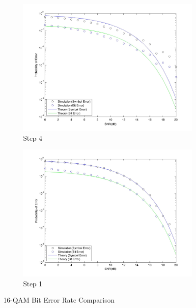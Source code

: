 \documentclass[]{article}
\begin{document}
\begin{figure}[h]
        \centering
        \begin{subfigure}[b]{0.4\textwidth}
                \includegraphics[width=\textwidth]{qam16SNR.jpg}
                \caption{Step 4}
                \label{fig:bpSNR}
        \end{subfigure}%
        \qquad \quad %
        \begin{subfigure}[b]{0.4\textwidth}
                \includegraphics[width=\textwidth]{qam16SNRstep1.jpg}
                \caption{Step 1}
                \label{fig:bpSNR1}
        \end{subfigure}
        \caption{16-QAM Bit Error Rate Comparison \label{fig:qam16}}
\end{figure}
\end{document}
